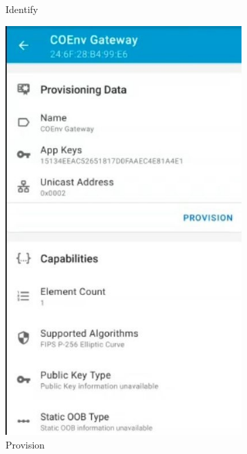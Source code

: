\documentclass[../monografia.tex]{subfiles}
\begin{document}
\begin{figure}[h]
\begin{subfigure}[b]{0.22\textwidth}
		\caption{Identify}
		\label{fig:mesh-bind-1}
	\end{subfigure}
	\begin{subfigure}[b]{0.22\textwidth}
		\centering
		\includegraphics[width=\textwidth]{mesh-bind-2}
		\caption{Provision}
		\label{fig:mesh-bind-2}
	\end{subfigure} %
	\begin{subfigure}[b]{0.22\textwidth}
		\centering

\end{subfigure}
\end{figure}
\end{document}
